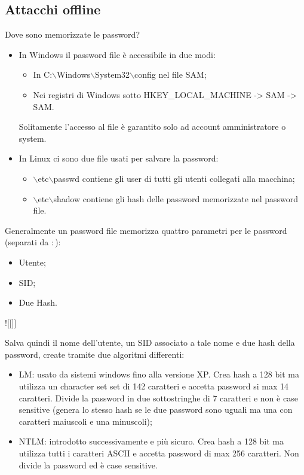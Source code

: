 \subsection{Attacchi offline}
Dove sono memorizzate le password?
\begin{itemize}
    \item In Windows il password file è accessibile in due modi: 
    	\begin{itemize}
    	    \item In C:$\backslash$Windows$\backslash$System32$\backslash$config nel file SAM;
    	    \item Nei registri di Windows sotto HKEY\_LOCAL\_MACHINE -> SAM -> SAM. 
    	\end{itemize}
     \noindent Solitamente l'accesso al file è garantito solo ad account amministratore o system.
    \item In Linux ci sono due file usati per salvare la password:
    	\begin{itemize}
    	    \item $\backslash$etc$\backslash$passwd contiene gli user di tutti gli utenti collegati alla macchina;
        	\item $\backslash$etc$\backslash$shadow contiene gli hash delle password memorizzate nel password file.
    	\end{itemize}
\end{itemize}

\noindent Generalmente un password file memorizza quattro parametri per le password (separati da $:$):
\begin{itemize}
    \item Utente;
    \item SID;
    \item Due Hash.
\end{itemize}

![[]]

\noindent Salva quindi il nome dell'utente, un SID associato a tale nome e due hash della password, create tramite due algoritmi differenti:
\begin{itemize}
    \item LM: usato da sistemi windows fino alla versione XP. Crea hash a 128 bit ma utilizza un character set set di 142 caratteri e accetta password si max 14 caratteri. Divide la password in due sottostringhe di 7 caratteri e non è case sensitive (genera lo stesso hash se le due password sono uguali ma una con caratteri maiuscoli e una minuscoli);
    \item NTLM: introdotto successivamente e più sicuro. Crea hash a 128 bit ma utilizza tutti i caratteri ASCII e accetta password di max 256 caratteri. Non divide la password ed è case sensitive.
\end{itemize}


